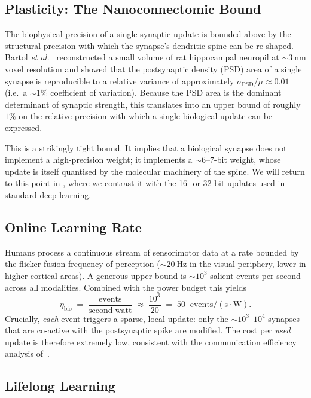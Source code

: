 \documentclass[11pt]{article}
\providecommand{\nano}{\ensuremath{\mathrm{n}}}
\providecommand{\meter}{\ensuremath{\mathrm{m}}}
\providecommand{\hertz}{\ensuremath{\mathrm{Hz}}}
\theoremstyle{definition}
\theoremstyle{remark}
\begin{document}
\subsection{Plasticity: The Nanoconnectomic Bound}

The biophysical precision of a single synaptic update is bounded
above by the structural precision with which the synapse's dendritic
spine can be re-shaped.  Bartol \emph{et al.}~\cite{bartol2015nanoconnectomic}
reconstructed a small volume of rat hippocampal neuropil at
$\sim\!\SI{3}{\nano\meter}$ voxel resolution and showed that the
postsynaptic density (PSD) area of a single synapse is reproducible to
a relative variance of approximately $\sigma_{\mathrm{PSD}}/\mu
\approx 0.01$ (i.e.\ a $\sim 1\%$ coefficient of variation).  Because
the PSD area is the dominant determinant of synaptic strength, this
translates into an upper bound of roughly $1\%$ on the relative
precision with which a single biological update can be expressed.

This is a strikingly tight bound.  It implies that a biological
synapse does not implement a high-precision weight; it implements a
$\sim 6$--$7$-bit weight, whose update is itself quantised by the
molecular machinery of the spine.  We will return to this point in
, where we contrast it with the 16- or 32-bit updates
used in standard deep learning.

\subsection{Online Learning Rate}
\label{sec:online}

Humans process a continuous stream of sensorimotor data at a rate
bounded by the flicker-fusion frequency of perception
($\sim\!\SI{20}{\hertz}$ in the visual periphery, lower in higher
cortical areas).  A generous upper bound is $\sim\!10^{3}$ salient
events per second across all modalities.  Combined with the power
budget this yields
\[
  \eta_{\mathrm{bio}} \;=\;
  \frac{\text{events}}{\text{second}\cdot\text{watt}}
  \;\approx\; \frac{10^{3}}{20}
  \;=\; 50\;\;\mathrm{events}/(\mathrm{s}\cdot\mathrm{W}).
\]
Crucially, \emph{each} event triggers a sparse, local update: only
the $\sim 10^{3}$--$10^{4}$ synapses that are co-active with the
postsynaptic spike are modified.  The cost per \emph{used} update is
therefore extremely low, consistent with the communication efficiency
analysis of~\cite{laughlin2003communication}.

\subsection{Lifelong Learning}
\end{document}
